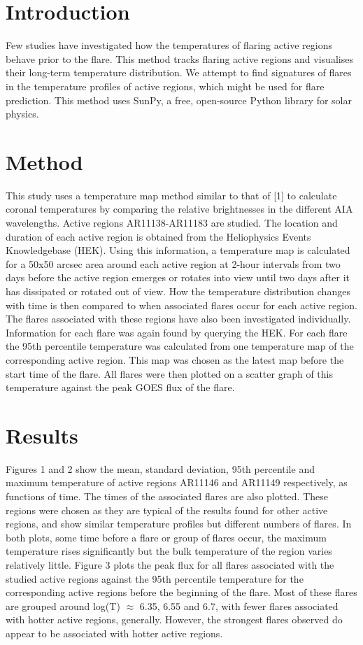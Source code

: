 \documentclass{article}
\begin{document}
\section{Introduction}
Few studies have investigated how the temperatures of flaring active regions behave prior to the flare.
This method tracks flaring active regions and visualises their long-term temperature distribution.
We attempt to find signatures of flares in the temperature profiles of active regions, which might be used for flare prediction.
This method uses SunPy, a free, open-source Python library for solar physics.

\section{Method}
This study uses a temperature map method similar to that of [1] to calculate coronal temperatures by comparing the relative brightnesses in the different AIA wavelengths.
Active regions AR11138-AR11183 are studied.
The location and duration of each active region is obtained from the Heliophysics Events Knowledgebase (HEK).
Using this information, a temperature map is calculated for a 50x50 arcsec area around each active region at 2-hour intervals from two days before the active region emerges or rotates into view until two days after it has dissipated or rotated out of view.
How the temperature distribution changes with time is then compared to when associated flares occur for each active region.
The flares associated with these regions have also been investigated individually.
Information for each flare was again found by querying the HEK.
For each flare the 95th percentile temperature was calculated from one temperature map of the corresponding active region.
This map was chosen as the latest map before the start time of the flare.
All flares were then plotted on a scatter graph of this temperature against the peak GOES flux of the flare.

\section{Results}
Figures 1 and 2 show the mean, standard deviation, 95th percentile and maximum temperature of active regions AR11146 and AR11149 respectively, as functions of time.
The times of the associated flares are also plotted. These regions were chosen as they are typical of the results found for other active regions, and show similar temperature profiles but different numbers of flares. In both plots, some time before a flare or group of flares occur, the maximum temperature rises significantly but the bulk temperature of the region varies relatively little.
Figure 3 plots the peak flux for all flares associated with the studied active regions against the 95th percentile temperature for the corresponding active regions before the beginning of the flare.
Most of these flares are grouped around log(T) $\approx$ 6.35, 6.55 and 6.7, with fewer flares associated with hotter active regions, generally.
However, the strongest flares observed do appear to be associated with hotter active regions.
\end{document}
